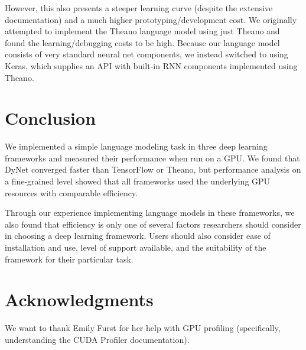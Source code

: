 \documentclass{article}
\begin{document}
However, this also presents a steeper learning curve (despite the extensive documentation) and a much higher prototyping/development cost. We originally attempted to implement the Theano language model using just Theano and found the learning/debugging costs to be high. Because our language model consists of very standard neural net components, we instead switched to using Keras, which supplies an API with built-in RNN components implemented using Theano.


\section{Conclusion}
We implemented a simple language modeling task in three deep learning frameworks and measured their performance when run on a GPU. We found that DyNet converged faster than TensorFlow or Theano, but performance analysis on a fine-grained level showed that all frameworks used the underlying GPU resources with comparable efficiency.

Through our experience implementing language models in these frameworks, we also found that efficiency is only one of several factors researchers should consider in choosing a deep learning framework. Users should also consider ease of installation and use, level of support available, and the suitability of the framework for their particular task.

\section*{Acknowledgments}
We want to thank Emily Furst for her help with GPU profiling (specifically, understanding the CUDA Profiler documentation).
\newpage


\end{document}
